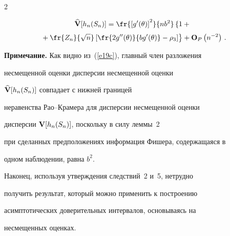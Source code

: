 \begin{multicols}{2}
{  \begin{multline}


  \widehat{\bf {V}}[h_n(S_n)]=


      \fr{\left[g'(\theta) \right]^2}{nb^2}


      \vphantom{\fr{2g''(\theta)}{b g'(\theta)}}\left\{       \vphantom{\fr{2g''(\theta)}{b g'(\theta)}}


      1+{}\right.\\[3pt]


\left.      {}+


      \fr{Z_n}{\sqrt{n}} \left[\fr{2g''(\theta)}{b g'(\theta)}-\rho_3


       \right] \right\}+{\bf O}_P\left(n^{-2}\right)\,.


       \label{e19c}


\end{multline}


   }





\bigskip





\noindent


{\bf Примечание.} Как видно из~(\ref{e19c}), главный член разложения


   несмещенной оценки дисперсии несмещенной оценки


   $\widehat{\bf {V}}[h_n(S_n)]$ совпадает с нижней границей


   неравенства Рао--Крамера для дисперсии несмещенной оценки


   дисперсии ${\bf {V}}[h_n(S_n)]$, поскольку в силу леммы~2


   при сделанных предположениях информация Фишера, содержащаяся в


   одном наблюдении, равна $b^2$.





    Наконец, используя утверждения следствий~2 и~5, нетрудно


    получить результат, который можно применить к построению


    асимптотических доверительных интервалов, основываясь на


    несмещенных оценках. 





\medskip






\end{multicols}
